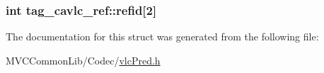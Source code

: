 \label{structtag__cavlc__ref_abae0c90668fedb380b2cc0773cfa351d}
\hypertarget{structtag__cavlc__ref_a071bb830fe08f1df5618d391ed428221}{
\subsubsection[{refid}]{\setlength{\rightskip}{0pt plus 5cm}int {\bf tag\_\-cavlc\_\-ref::refid}\mbox{[}2\mbox{]}}}
\label{structtag__cavlc__ref_a071bb830fe08f1df5618d391ed428221}


The documentation for this struct was generated from the following file:\begin{DoxyCompactItemize}
\item 
MVCCommonLib/Codec/\hyperlink{vlc_pred_8h}{vlcPred.h}\end{DoxyCompactItemize}
